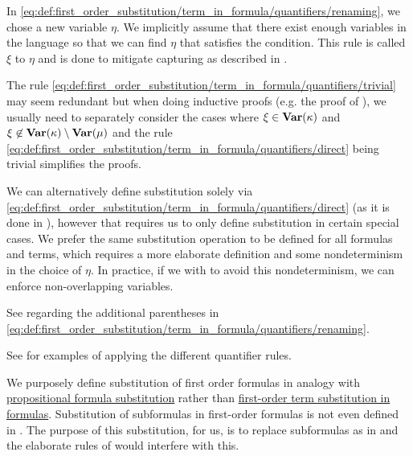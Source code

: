 \begin{definition}
\begin{thmenum}
    In \eqref{eq:def:first_order_substitution/term_in_formula/quantifiers/renaming}, we chose a new variable \( \eta \). We implicitly assume that there exist enough variables in the language so that we can find \( \eta \) that satisfies the condition. This rule is called  \( \xi \) to \( \eta \) and is done to mitigate capturing as described in .

    The rule \eqref{eq:def:first_order_substitution/term_in_formula/quantifiers/trivial} may seem redundant but when doing inductive proofs (e.g. the proof of ), we usually need to separately consider the cases where \( \xi \in \operatorname{\mathbf{Var}}(\kappa) \) and \( \xi \not\in \operatorname{\mathbf{Var}}(\kappa) \setminus \operatorname{\mathbf{Var}}(\mu) \) and the rule \eqref{eq:def:first_order_substitution/term_in_formula/quantifiers/direct} being trivial simplifies the proofs.

    We can alternatively define substitution solely via \eqref{eq:def:first_order_substitution/term_in_formula/quantifiers/direct} (as it is done in \cite[def. 14.25]{OpenLogic20201202}), however that requires us to only define substitution in certain special cases. We prefer the same substitution operation to be defined for all formulas and terms, which requires a more elaborate definition and some nondeterminism in the choice of \( \eta \). In practice, if we with to avoid this nondeterminism, we can enforce non-overlapping variables.

    See  regarding the additional parentheses in \eqref{eq:def:first_order_substitution/term_in_formula/quantifiers/renaming}.

    See  for examples of applying the different quantifier rules.

     We purposely define substitution of first order formulas in analogy with \hyperref[def:propositional_substitution/single]{propositional formula substitution} rather than \hyperref[def:first_order_substitution/term_in_formula]{first-order term substitution in formulas}. Substitution of subformulas in first-order formulas is not even defined in \cite{OpenLogic20201202}. The purpose of this substitution, for us, is to replace subformulas as in  and the elaborate rules of  would interfere with this.


\end{thmenum}
\end{definition}
